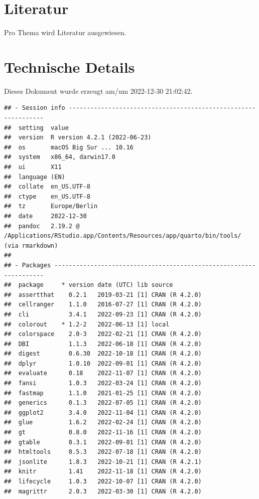 \documentclass[
  a4paper,
  DIV=11]{scrreprt}
\theoremstyle{definition}
\theoremstyle{remark}
\begin{document}
\hypertarget{literatur}{%
\section*{Literatur}\label{literatur}}

Pro Thema wird Literatur ausgewiesen.

\hypertarget{technische-details}{%
\section*{Technische Details}\label{technische-details}}

Dieses Dokument wurde erzeugt am/um 2022-12-30 21:02:42.

\begin{verbatim}
## - Session info ---------------------------------------------------------------
##  setting  value
##  version  R version 4.2.1 (2022-06-23)
##  os       macOS Big Sur ... 10.16
##  system   x86_64, darwin17.0
##  ui       X11
##  language (EN)
##  collate  en_US.UTF-8
##  ctype    en_US.UTF-8
##  tz       Europe/Berlin
##  date     2022-12-30
##  pandoc   2.19.2 @ /Applications/RStudio.app/Contents/Resources/app/quarto/bin/tools/ (via rmarkdown)
## 
## - Packages -------------------------------------------------------------------
##  package     * version date (UTC) lib source
##  assertthat    0.2.1   2019-03-21 [1] CRAN (R 4.2.0)
##  cellranger    1.1.0   2016-07-27 [1] CRAN (R 4.2.0)
##  cli           3.4.1   2022-09-23 [1] CRAN (R 4.2.0)
##  colorout    * 1.2-2   2022-06-13 [1] local
##  colorspace    2.0-3   2022-02-21 [1] CRAN (R 4.2.0)
##  DBI           1.1.3   2022-06-18 [1] CRAN (R 4.2.0)
##  digest        0.6.30  2022-10-18 [1] CRAN (R 4.2.0)
##  dplyr         1.0.10  2022-09-01 [1] CRAN (R 4.2.0)
##  evaluate      0.18    2022-11-07 [1] CRAN (R 4.2.0)
##  fansi         1.0.3   2022-03-24 [1] CRAN (R 4.2.0)
##  fastmap       1.1.0   2021-01-25 [1] CRAN (R 4.2.0)
##  generics      0.1.3   2022-07-05 [1] CRAN (R 4.2.0)
##  ggplot2       3.4.0   2022-11-04 [1] CRAN (R 4.2.0)
##  glue          1.6.2   2022-02-24 [1] CRAN (R 4.2.0)
##  gt            0.8.0   2022-11-16 [1] CRAN (R 4.2.0)
##  gtable        0.3.1   2022-09-01 [1] CRAN (R 4.2.0)
##  htmltools     0.5.3   2022-07-18 [1] CRAN (R 4.2.0)
##  jsonlite      1.8.3   2022-10-21 [1] CRAN (R 4.2.1)
##  knitr         1.41    2022-11-18 [1] CRAN (R 4.2.0)
##  lifecycle     1.0.3   2022-10-07 [1] CRAN (R 4.2.0)
##  magrittr      2.0.3   2022-03-30 [1] CRAN (R 4.2.0)

\end{verbatim}
\end{document}
